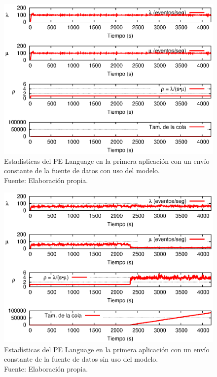 \begin{figure}[!ht]
    \centering
    \captionsetup{justification=centering}
    \includegraphics[scale=1.1]{images/exp/app1/uniform/cm/statusLanguagePE.eps}
    \caption[Estad\'isticas del PE Language en la primera aplicaci\'on con un env\'io constante de la fuente de datos con uso del modelo.]{Estad\'isticas del PE Language en la primera aplicaci\'on con un env\'io constante de la fuente de datos con uso del modelo.\\Fuente: Elaboraci\'on propia.}
    \label{fig:app1-uniform-statusLanguagePE-cm}
\end{figure}

\begin{figure}[!ht]
    \centering
    \captionsetup{justification=centering}
    \includegraphics[scale=1]{images/exp/app1/uniform/sm/statusLanguagePE.eps}
    \caption[Estad\'isticas del PE Language en la primera aplicaci\'on con un env\'io constante de la fuente de datos sin uso del modelo.]{Estad\'isticas del PE Language en la primera aplicaci\'on con un env\'io constante de la fuente de datos sin uso del modelo.\\Fuente: Elaboraci\'on propia.}
    \label{fig:app1-uniform-statusLanguagePE-sm}
\end{figure}

